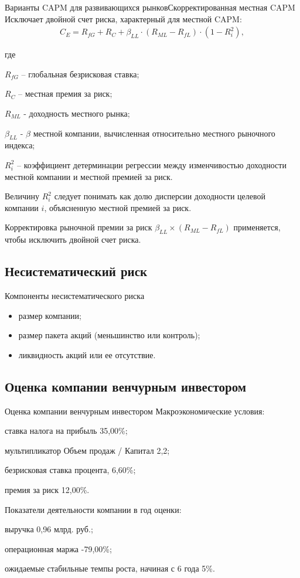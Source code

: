 \documentclass[_Venture_p2.tex]{subfiles}
\begin{document}
\begin{frame}[allowframebreaks]{Варианты CAPM для развивающихся рынков}{Скорректированная местная CAPM}
Исключает двойной счет риска, характерный для местной CAPM:
\begin{align}
C_E=R_{fG}+R_C+\beta_{LL} \cdot (R_{ML}-R_{fL} ) \cdot (1-R_i^2 ),
\end{align}

где 

$R_{fG}$ – глобальная безрисковая ставка;

$R_C$ – местная премия за риск;

$R_{ML}$ - доходность местного рынка;

\pagebreak

$\beta_{LL}$ - $\beta$ местной компании, вычисленная относительно местного рыночного индекса; 

$R_i^2$ – коэффициент детерминации регрессии между изменчивостью доходности местной компании и местной премией за риск. 

\pagebreak
Величину $R_i^2$ следует понимать как долю дисперсии доходности целевой компании $i$, объясненную местной премией за риск.

Корректировка рыночной премии за риск $\beta_{LL}×(R_{ML}-R_{fL} )$ применяется, чтобы исключить двойной счет риска.

\end{frame}

\subsection{Несистематический риск}
\begin{frame}{Компоненты несистематического риска}{}
\begin{itemize}
	\item размер компании;
	\item размер пакета акций (меньшинство или контроль);
	\item ликвидность акций или ее отсутствие.
\end{itemize}
\end{frame}

\subsection{Оценка компании венчурным инвестором}
\begin{frame}[allowframebreaks]{Оценка компании венчурным инвестором}
Макроэкономические условия:

ставка налога на прибыль 35,00\%;

мультипликатор Объем продаж / Капитал 2,2;

безрисковая ставка процента, 6,60\%;

премия за риск	12,00\%.

\pagebreak

Показатели деятельности компании в год оценки:

выручка 0,96 млрд. руб.;

операционная маржа -79,00\%;

ожидаемые стабильные темпы роста, начиная с 6 года 5\%.

\end{frame}
\end{document}
